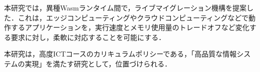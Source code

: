 本研究では，異種Wasmランタイム間で，ライブマイグレーション機構を提案した．これは，エッジコンピューティングやクラウドコンピューティングなどで動作するアプリケーションを，実行速度とメモリ使用量のトレードオフなど変化する要求に対し，柔軟に対応することを可能にする．

本研究は，高度ICTコースのカリキュラムポリシーである，「高品質な情報システムの実現」を満たす研究として，位置づけられる．